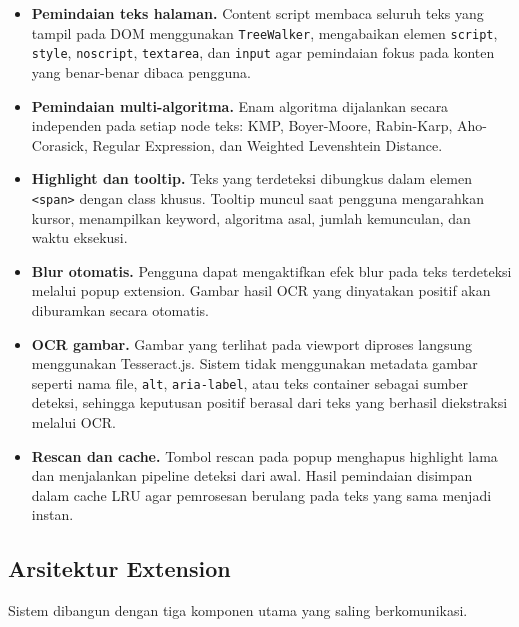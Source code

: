 \begin{itemize}
    \item \textbf{Pemindaian teks halaman.}
    Content script membaca seluruh teks yang tampil pada DOM menggunakan
    \texttt{TreeWalker}, mengabaikan elemen \texttt{script},
    \texttt{style}, \texttt{noscript}, \texttt{textarea}, dan
    \texttt{input} agar pemindaian fokus pada konten yang benar-benar
    dibaca pengguna.

    \item \textbf{Pemindaian multi-algoritma.}
    Enam algoritma dijalankan secara independen pada setiap node teks:
    KMP, Boyer-Moore, Rabin-Karp, Aho-Corasick, Regular Expression, dan
    Weighted Levenshtein Distance.

    \item \textbf{Highlight dan tooltip.}
    Teks yang terdeteksi dibungkus dalam elemen \texttt{<span>} dengan
    class khusus. Tooltip muncul saat pengguna mengarahkan kursor,
    menampilkan keyword, algoritma asal, jumlah kemunculan, dan waktu
    eksekusi.

    \item \textbf{Blur otomatis.}
    Pengguna dapat mengaktifkan efek blur pada teks terdeteksi melalui
    popup extension. Gambar hasil OCR yang dinyatakan positif akan
    diburamkan secara otomatis.

    \item \textbf{OCR gambar.}
    Gambar yang terlihat pada viewport diproses langsung menggunakan
    Tesseract.js. Sistem tidak menggunakan metadata gambar seperti nama file,
    \texttt{alt}, \texttt{aria-label}, atau teks container sebagai sumber
    deteksi, sehingga keputusan positif berasal dari teks yang berhasil
    diekstraksi melalui OCR.

    \item \textbf{Rescan dan cache.}
    Tombol rescan pada popup menghapus highlight lama dan menjalankan
    pipeline deteksi dari awal. Hasil pemindaian disimpan dalam cache LRU
    agar pemrosesan berulang pada teks yang sama menjadi instan.
\end{itemize}

\subsection{Arsitektur Extension}

Sistem dibangun dengan tiga komponen utama yang saling berkomunikasi.

